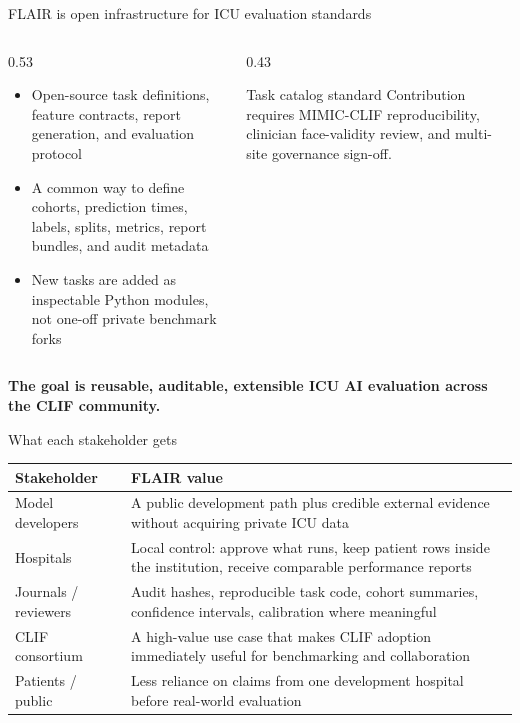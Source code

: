 \documentclass[aspectratio=169,11pt,xcolor={table}]{beamer}
\begin{document}
\begin{frame}{FLAIR is open infrastructure for ICU evaluation standards}
  \begin{columns}[T]
  \begin{column}{0.53\textwidth}
    \begin{itemize}
      \item Open-source task definitions, feature contracts, report generation, and evaluation protocol
      \item A common way to define cohorts, prediction times, labels, splits, metrics, report bundles, and audit metadata
      \item New tasks are added as inspectable Python modules, not one-off private benchmark forks
    \end{itemize}
  \end{column}
  \begin{column}{0.43\textwidth}
    \begin{block}{Task catalog standard}
      Contribution requires MIMIC-CLIF reproducibility, clinician face-validity review, and multi-site governance sign-off.
    \end{block}
  \end{column}
  \end{columns}
  \vfill
  \begin{center}\color{flairblue}\textbf{The goal is reusable, auditable, extensible ICU AI evaluation across the CLIF community.}\end{center}
\end{frame}

\begin{frame}{What each stakeholder gets}
  \begin{center}
  \small
  \setlength{\tabcolsep}{5pt}
  \begin{tabular}{>{\raggedright\arraybackslash}p{3.2cm}>{\raggedright\arraybackslash}p{8.1cm}}
  \toprule
  \textbf{Stakeholder} & \textbf{FLAIR value} \\
  \midrule
  Model developers & A public development path plus credible external evidence without acquiring private ICU data \\
  Hospitals & Local control: approve what runs, keep patient rows inside the institution, receive comparable performance reports \\
  Journals / reviewers & Audit hashes, reproducible task code, cohort summaries, confidence intervals, calibration where meaningful \\
  CLIF consortium & A high-value use case that makes CLIF adoption immediately useful for benchmarking and collaboration \\
  Patients / public & Less reliance on claims from one development hospital before real-world evaluation \\
  \bottomrule
  \end{tabular}
  \end{center}
\end{frame}
\end{document}
